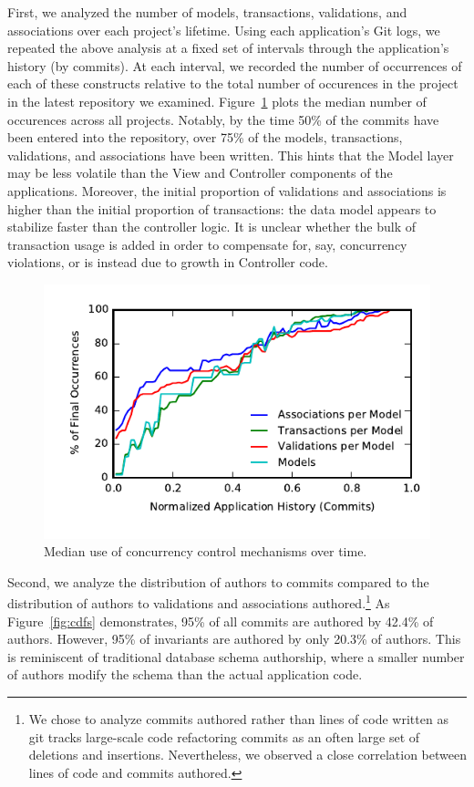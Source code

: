 First, we analyzed the number of models, transactions, validations,
and associations over each project's lifetime. Using each
application's Git logs, we repeated the above analysis at a fixed set
of intervals through the application's history (by commits). At each
interval, we recorded the number of occurrences of each of these
constructs relative to the total number of occurences in the project
in the latest repository we examined. Figure~\ref{fig:historical}
plots the median number of occurences across all projects. Notably, by
the time 50\% of the commits have been entered into the repository,
over 75\% of the models, transactions, validations, and associations
have been written. This hints that the Model layer may be less
volatile than the View and Controller components of the
applications. Moreover, the initial proportion of validations and
associations is higher than the initial proportion of transactions:
the data model appears to stabilize faster than the controller
logic. It is unclear whether the bulk of transaction usage is added in
order to compensate for, say, concurrency violations, or is instead
due to growth in Controller code.

\begin{figure}
\includegraphics[width=\columnwidth]{figs/historical-median.pdf}
\caption{Median use of concurrency control mechanisms over time.}
\label{fig:historical}
\end{figure}

Second, we analyze the distribution of authors to commits compared to
the distribution of authors to validations and associations
authored.\footnote{We chose to analyze commits authored rather than
  lines of code written as git tracks large-scale code refactoring
  commits as an often large set of deletions and
  insertions. Nevertheless, we observed a close correlation between
  lines of code and commits authored.} As Figure~\ref{fig:cdfs} demonstrates, 95\% of all commits
are authored by 42.4\% of authors. However, 95\% of invariants are
authored by only 20.3\% of authors. This is reminiscent of traditional
database schema authorship, where a smaller number of authors modify
the schema than the actual application code.

